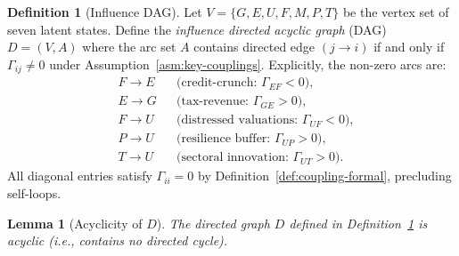 \documentclass[12pt,openany]{book}
\newcommand{\calE}{\mathcal{E}}
\newcommand{\calF}{\mathcal{F}}
\newcommand{\calG}{\mathcal{G}}
\newcommand{\calP}{\mathcal{P}}
\newcommand{\calU}{\mathcal{U}}
\newcommand{\calM}{\mathcal{M}}
\newcommand{\calT}{\mathcal{T}}
\numberwithin{equation}{chapter}
\theoremstyle{plain}
\newtheorem{lemma}[theorem]{Lemma}
\theoremstyle{definition}
\newtheorem{definition}[theorem]{Definition}
\theoremstyle{remark}
\def\mathcal#1{#1}%
\begin{document}
\begin{definition}[Influence DAG]
\label{def:influence-dag}
Let $\mathcal{V} = \{\calG,\calE,\calU,\calF,\calM,\calP,\calT\}$
be the vertex set of seven latent states.  Define the
\emph{influence directed acyclic graph} (DAG)
$\mathcal{D} = (\mathcal{V}, \mathcal{A})$ where the arc set
$\mathcal{A}$ contains directed edge $(j \to i)$ if and only if
$\Gamma_{ij} \neq 0$ under Assumption~\ref{asm:key-couplings}.
Explicitly, the non-zero arcs are:
\begin{align}
  &\calF \to \calE
    &&\text{(credit-crunch: } \Gamma_{\calE\calF} < 0\text{)},
    \label{eq:arc1}\\
  &\calE \to \calG
    &&\text{(tax-revenue: } \Gamma_{\calG\calE} > 0\text{)},
    \label{eq:arc2}\\
  &\calF \to \calU
    &&\text{(distressed valuations: }
       \Gamma_{\calU\calF} < 0\text{)},
    \label{eq:arc3}\\
  &\calP \to \calU
    &&\text{(resilience buffer: }
       \Gamma_{\calU\calP} > 0\text{)},
    \label{eq:arc4}\\
  &\calT \to \calU
    &&\text{(sectoral innovation: }
       \Gamma_{\calU\calT} > 0\text{)}.
    \label{eq:arc5}
\end{align}
All diagonal entries satisfy $\Gamma_{ii}=0$ by
Definition~\ref{def:coupling-formal}, precluding self-loops.
\end{definition}

\begin{lemma}[Acyclicity of $\mathcal{D}$]
\label{lem:dag-acyclic}
The directed graph $\mathcal{D}$ defined in
Definition~\ref{def:influence-dag} is acyclic (i.e., contains
no directed cycle).
\end{lemma}
\end{document}
